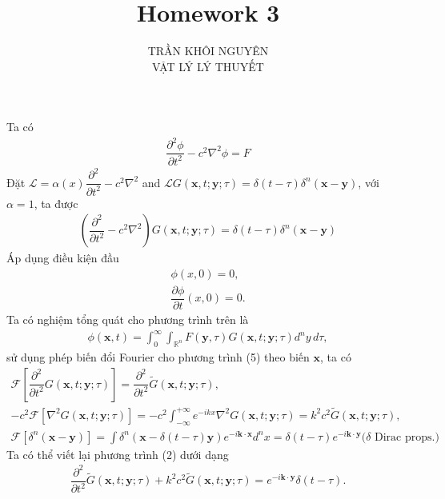 \documentclass{report}
\title{\Huge{Homework 3}}
\newcommand{\f}[2]{\dfrac{#1}{#2}}
\begin{document}
	\setlength{\parindent}{20pt}
	\newpage
	\author{TRẦN KHÔI NGUYÊN \\ VẬT LÝ LÝ THUYẾT}
	\maketitle
	Ta có
	\begin{gather}
		\f{\partial^{2} \phi}{\partial t^{2}} - c^{2} \nabla^{2} \phi = F
	\end{gather}
	Đặt $\mathcal{L} = \alpha(x) \f{\partial^{2}}{\partial t^{2}} - c^{2} \nabla^{2}$ and $\mathcal{L} G(\mathbf{x},t;\mathbf{y};\tau) = \delta(t - \tau) \delta^{n}(\mathbf{x} - \mathbf{y})$, với $\alpha = 1$, ta được
	\begin{gather}
		\left( \f{\partial^{2}}{\partial t^{2}} - c^{2} {\nabla}^{2} \right) G(\mathbf{x},t;\mathbf{y};\tau) = \delta(t - \tau) \delta^{n}(\mathbf{x} - \mathbf{y})
	\end{gather}
	Áp dụng điều kiện đầu
	\begin{gather}
		\phi(x,0) = 0,\\
		\f{\partial \phi}{\partial t}(x,0) = 0.
	\end{gather}	
	Ta có nghiệm tổng quát cho phương trình trên là
	\begin{gather}
		\phi(\mathbf{x},t) = \int_{0}^{\infty} \int_{\mathbb{R}^{n}} F(\mathbf{y}, \tau) G(\mathbf{x},t;\mathbf{y};\tau) d^{n} y\, d \tau,
	\end{gather}
	sử dụng phép biến đổi Fourier cho phương trình (5) theo biến $\mathbf{x}$, ta có
	\begin{gather}
		\mathcal{F} \left[\f{\partial^{2}}{\partial t^{2}} G(\mathbf{x},t;\mathbf{y};\tau)\right] = \f{\partial^{2}}{\partial t^{2}} \tilde{G}(\mathbf{x},t;\mathbf{y};\tau),\\
		- c^{2}\mathcal{F}  \left[\nabla^{2} G(\mathbf{x},t;\mathbf{y};\tau)\right] = - c^{2} \int_{-\infty}^{+\infty} e^{-i k x} \nabla^{2} {G}(\mathbf{x},t;\mathbf{y};\tau) = k^{2} c^{2} \tilde{G}(\mathbf{x},t;\mathbf{y};\tau),\\
		\mathcal{F} \left[ \delta^{n}(\mathbf{x} - \mathbf{y}) \right] = \int \delta^{n}(\mathbf{x} - \delta(t - \tau)\mathbf{y}) e^{-i \mathbf{k} \cdot \mathbf{x}} d^{n} {x} = \delta(t - \tau)e^{-i \mathbf{k} \cdot \mathbf{y}} \text{($\delta$ Dirac props.)}
	\end{gather} 
	Ta có thể viết lại phương trình (2) dưới dạng
	\begin{gather}
		\f{\partial^{2}}{\partial t^{2}} \tilde{G}(\mathbf{x},t;\mathbf{y};\tau) + k^{2} c^{2} \tilde{G}(\mathbf{x},t;\mathbf{y};\tau)  = e^{-i \mathbf{k} \cdot \mathbf{y}} \delta(t - \tau).
	\end{gather}
\end{document}
